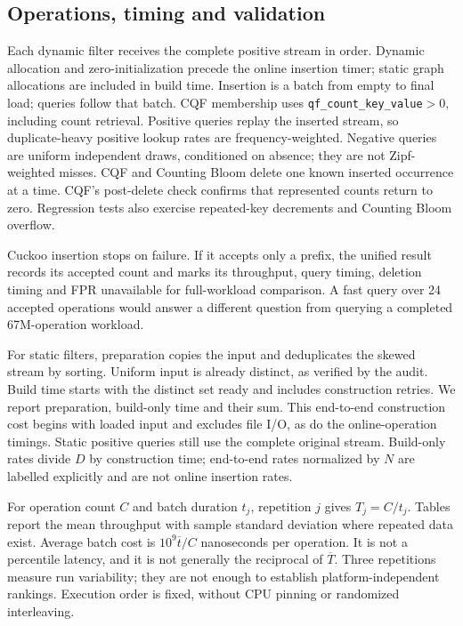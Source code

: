 \subsection{Operations, timing and validation}
Each dynamic filter receives the complete positive stream in order. Dynamic allocation and zero-initialization precede the online insertion timer; static graph allocations are included in build time. Insertion is a batch from empty to final load; queries follow that batch. CQF membership uses \texttt{qf\_count\_key\_value}$>0$, including count retrieval. Positive queries replay the inserted stream, so duplicate-heavy positive lookup rates are frequency-weighted. Negative queries are uniform independent draws, conditioned on absence; they are not Zipf-weighted misses. CQF and Counting Bloom delete one known inserted occurrence at a time. CQF's post-delete check confirms that represented counts return to zero. Regression tests also exercise repeated-key decrements and Counting Bloom overflow.

Cuckoo insertion stops on failure. If it accepts only a prefix, the unified result records its accepted count and marks its throughput, query timing, deletion timing and FPR unavailable for full-workload comparison. A fast query over 24 accepted operations would answer a different question from querying a completed 67M-operation workload.

For static filters, preparation copies the input and deduplicates the skewed stream by sorting. Uniform input is already distinct, as verified by the audit. Build time starts with the distinct set ready and includes construction retries. We report preparation, build-only time and their sum. This end-to-end construction cost begins with loaded input and excludes file I/O, as do the online-operation timings. Static positive queries still use the complete original stream. Build-only rates divide $D$ by construction time; end-to-end rates normalized by $N$ are labelled explicitly and are not online insertion rates.

For operation count $C$ and batch duration $t_j$, repetition $j$ gives $T_j=C/t_j$. Tables report the mean throughput with sample standard deviation where repeated data exist. Average batch cost is $10^9\overline{t}/C$ nanoseconds per operation. It is not a percentile latency, and it is not generally the reciprocal of $\overline{T}$. Three repetitions measure run variability; they are not enough to establish platform-independent rankings. Execution order is fixed, without CPU pinning or randomized interleaving.

